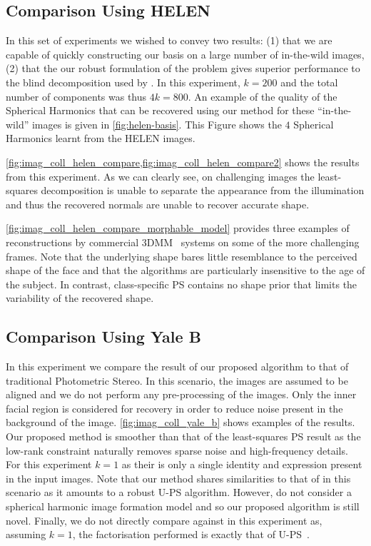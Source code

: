 \subsection{Comparison Using HELEN}\label{subsec:imag_coll_experiments_helen}
In this set of experiments we wished to convey two results: (1) that we are
capable of quickly constructing our basis on a large number of in-the-wild
images, (2) that the our robust formulation of the problem gives superior
performance to the blind decomposition used by \citet{KemelmacherShlizerman:2013iv}.
In this experiment, $k = 200$ and the total number of components was thus $4k = 800$.
An example of the quality of the Spherical
Harmonics that can be recovered using our method for these ``in-the-wild''
images is given in \cref{fig:helen-basis}. This Figure shows the $4$ Spherical
Harmonics learnt from the HELEN images.

\cref{fig:imag_coll_helen_compare,fig:imag_coll_helen_compare2} shows
the results from this experiment. As we can
clearly see, on challenging images the least-squares decomposition is unable to
separate the appearance from the illumination and thus the recovered normals are
unable to recover accurate shape.

\cref{fig:imag_coll_helen_compare_morphable_model} provides three examples
of reconstructions by commercial 3DMM~\cite{volker1999morphable} systems on
some of the more challenging frames. Note that the underlying shape bares little
resemblance to the perceived shape of the face and that the algorithms are
particularly insensitive to the age of the subject. In contrast, class-specific
PS contains no shape prior that limits the variability of the recovered shape.
\subsection{Comparison Using Yale B}\label{subsec:imag_coll_experiments_yaleb}
In this experiment we compare the result of our proposed algorithm to
that of traditional Photometric Stereo. In this scenario, the images are assumed
to be aligned and we do not perform any pre-processing of the images. Only the
inner facial region is considered for recovery in order to reduce noise present
in the background of the image. \cref{fig:imag_coll_yale_b} shows examples
of the results. Our proposed method is smoother than that of the least-squares
PS result as the low-rank constraint naturally removes sparse noise and
high-frequency details. For this experiment $k = 1$ as their is only a single
identity and expression present in the input images. Note that our method
shares similarities to that of \citet{wu2010robust} in this scenario as it
amounts to a robust U-PS algorithm. However, \citet{wu2010robust} do not consider
a spherical harmonic image formation model and so our proposed algorithm is
still novel. Finally, we do not directly compare against
\citet{KemelmacherShlizerman:2013iv} in this experiment as, assuming $k = 1$,
the factorisation performed is exactly that of U-PS~\cite{basri2007photometric}.
